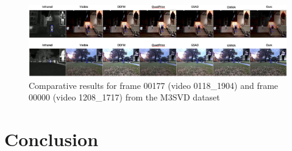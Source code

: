 \documentclass[journal]{IEEEtran}
\begin{document}
\begin{figure}[!t]
    \centering
    \includegraphics[width=1.0\textwidth]{chapter and images/Msvd.png}
    \caption{Comparative results for frame 00177 (video 0118\_1904) and frame 00000 (video 1208\_1717) from the M3SVD dataset}
    \label{fig:M3SVD}
\end{figure}

\section{Conclusion}

\ifCLASSOPTIONcaptionsoff
  \newpage
\fi

 
 
\end{document}
